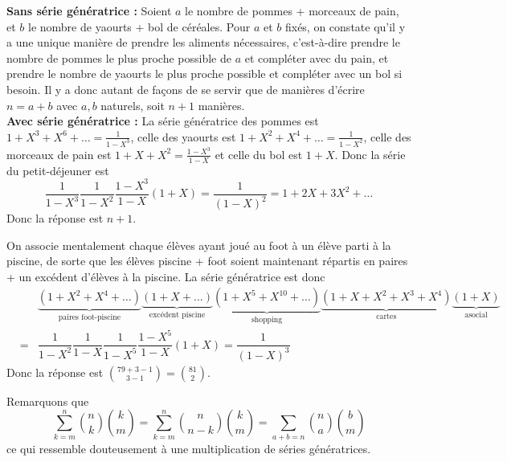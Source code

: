 \begin{sol}
\textbf{Sans série génératrice :} Soient $a$ le nombre de pommes + morceaux de pain, et $b$ le nombre de yaourts + bol de céréales. Pour $a$ et $b$ fixés, on constate qu'il y a une unique manière de prendre les aliments nécessaires, c'est-à-dire prendre le nombre de pommes le plus proche possible de $a$ et compléter avec du pain, et prendre le nombre de yaourts le plus proche possible et compléter avec un bol si besoin. Il y a donc autant de façons de se servir que de manières d'écrire $n = a + b$ avec $a, b$ naturels, soit $n + 1$ manières. \\
\textbf{Avec série génératrice :} La série génératrice des pommes est $1 + X^3 + X^6 + \dots = \frac 1{1 - X^3}$, celle des yaourts est $1 + X^2 + X^4 + \dots = \frac 1{1 - X^2}$, celle des morceaux de pain est $1 + X + X^2 = \frac{1 - X^3}{1 - X}$ et celle du bol est $1 + X$. Donc la série du petit-déjeuner est
$$\frac 1{1 - X^3}\frac 1{1 - X^2}\frac{1 - X^3}{1 - X}(1 + X) = \frac 1{(1 - X)^2} = 1 + 2X + 3X^2 + \dots $$
Donc la réponse est $n + 1$.
\end{sol}


\begin{sol}
On associe mentalement chaque élèves ayant joué au foot à un élève parti à la piscine, de sorte que les élèves piscine + foot soient maintenant répartis en paires + un excédent d'élèves à la piscine. La série génératrice est donc
$$\begin{array}{rcl}
&  & \underbrace{(1 + X^2 + X^4 + \dots)}_{\text{paires foot-piscine}}\underbrace{(1 + X + \dots)}_{\text{excédent piscine}}\underbrace{(1 + X^5 + X^{10} + \dots)}_{\text{shopping}}\underbrace{(1 + X + X^2 + X^3 + X^4)}_{\text{cartes}}\underbrace{(1 + X)}_{\text{asocial}} \\
& = & \dfrac{1}{1 - X^2}\dfrac{1}{1 - X}\dfrac{1}{1 - X^5}\dfrac{1 - X^5}{1 - X}(1 + X) = \dfrac{1}{(1 - X)^3}
\end{array}$$
Donc la réponse est $\binom{79 + 3 - 1}{3 - 1} = \binom{81}2$.
\end{sol}


\begin{sol}
\end{sol}


\begin{sol}
Remarquons que
$$\sum_{k = m}^n\binom n k\binom k m = \sum_{k = m}^n\binom n{n - k}\binom k m = \sum_{a + b = n}\binom n a\binom b m$$
ce qui ressemble douteusement à une multiplication de séries génératrices.
\end{sol}


